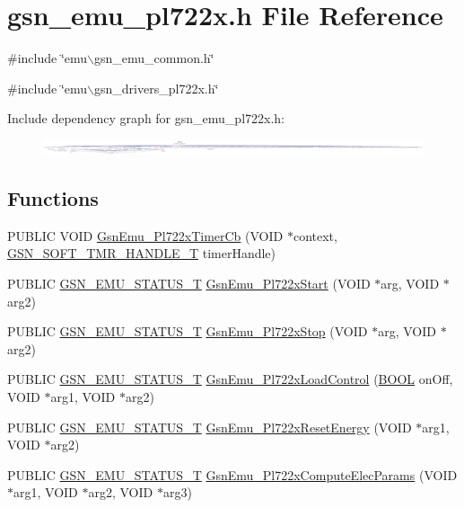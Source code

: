 \hypertarget{a00491}{
\section{gsn\_\-emu\_\-pl722x.h File Reference}
\label{a00491}
}
{\ttfamily \#include \char`\"{}emu$\backslash$gsn\_\-emu\_\-common.h\char`\"{}}\par
{\ttfamily \#include \char`\"{}emu$\backslash$gsn\_\-drivers\_\-pl722x.h\char`\"{}}\par
Include dependency graph for gsn\_\-emu\_\-pl722x.h:
\nopagebreak
\begin{figure}[H]
\begin{center}
\leavevmode
\includegraphics[width=400pt]{a00722}
\end{center}
\end{figure}
\subsection*{Functions}
\begin{DoxyCompactItemize}
\item 
PUBLIC VOID \hyperlink{a00491_a649e6405f8762235bd3bb456ac738c9d}{GsnEmu\_\-Pl722xTimerCb} (VOID $\ast$context, \hyperlink{a00229}{GSN\_\-SOFT\_\-TMR\_\-HANDLE\_\-T} timerHandle)
\item 
PUBLIC \hyperlink{a00490_aeda27e2bd7f74b1b9748e313d272033e}{GSN\_\-EMU\_\-STATUS\_\-T} \hyperlink{a00491_a7aa69cc6de3e4d08aec5d102268218c8}{GsnEmu\_\-Pl722xStart} (VOID $\ast$arg, VOID $\ast$arg2)
\item 
PUBLIC \hyperlink{a00490_aeda27e2bd7f74b1b9748e313d272033e}{GSN\_\-EMU\_\-STATUS\_\-T} \hyperlink{a00491_a31b9502c4626b883f3a6265bdcbb5592}{GsnEmu\_\-Pl722xStop} (VOID $\ast$arg, VOID $\ast$arg2)
\item 
PUBLIC \hyperlink{a00490_aeda27e2bd7f74b1b9748e313d272033e}{GSN\_\-EMU\_\-STATUS\_\-T} \hyperlink{a00491_a92a84ecbaeec3d4a08b9596b039a78c7}{GsnEmu\_\-Pl722xLoadControl} (\hyperlink{a00660_ga1f04022c0a182c51c059438790ea138c}{BOOL} onOff, VOID $\ast$arg1, VOID $\ast$arg2)
\item 
PUBLIC \hyperlink{a00490_aeda27e2bd7f74b1b9748e313d272033e}{GSN\_\-EMU\_\-STATUS\_\-T} \hyperlink{a00491_a8f98f968173a80f081bd216720169f44}{GsnEmu\_\-Pl722xResetEnergy} (VOID $\ast$arg1, VOID $\ast$arg2)
\item 
PUBLIC \hyperlink{a00490_aeda27e2bd7f74b1b9748e313d272033e}{GSN\_\-EMU\_\-STATUS\_\-T} \hyperlink{a00491_ad3d249ab2a0b6cddd94aa001806d5251}{GsnEmu\_\-Pl722xComputeElecParams} (VOID $\ast$arg1, VOID $\ast$arg2, VOID $\ast$arg3)
\end{DoxyCompactItemize}


